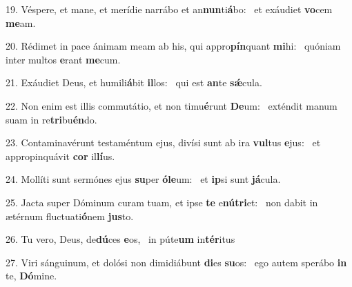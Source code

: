 19. Véspere, et mane, et merídie narrábo et an\textbf{nun}ti\textbf{á}bo: \ast\  et exáudiet \textbf{vo}cem \textbf{me}am.\

20. Rédimet in pace ánimam meam ab his, qui appro\textbf{pín}quant \textbf{mi}hi: \ast\  quóniam inter multos \textbf{e}rant \textbf{me}cum.\

21. Exáudiet Deus, et humili\textbf{á}bit \textbf{il}los: \ast\  qui est \textbf{an}te \textbf{sǽ}cula.\

22. Non enim est illis commutátio, et non timu\textbf{é}runt \textbf{De}um: \ast\  exténdit manum suam in re\textbf{tri}bu\textbf{én}do.\

23. Contaminavérunt testaméntum ejus, divísi sunt ab ira \textbf{vul}tus \textbf{e}jus: \ast\  et appropinquávit \textbf{cor} il\textbf{lí}us.\

24. Mollíti sunt sermónes ejus \textbf{su}per \textbf{ó}\textbf{le}um: \ast\  et \textbf{ip}si sunt \textbf{já}cula.\

25. Jacta super Dóminum curam tuam, et ipse \textbf{te} e\textbf{nú}\textbf{tri}et: \ast\  non dabit in ætérnum fluctuati\textbf{ó}nem \textbf{jus}to.\

26. Tu vero, Deus, de\textbf{dú}ces \textbf{e}os, \ast\  in púte\textbf{um} in\textbf{tér}itus\

27. Viri sánguinum, et dolósi non dimidiábunt \textbf{di}es \textbf{su}os: \ast\  ego autem sperábo \textbf{in} te, \textbf{Dó}mine.\

